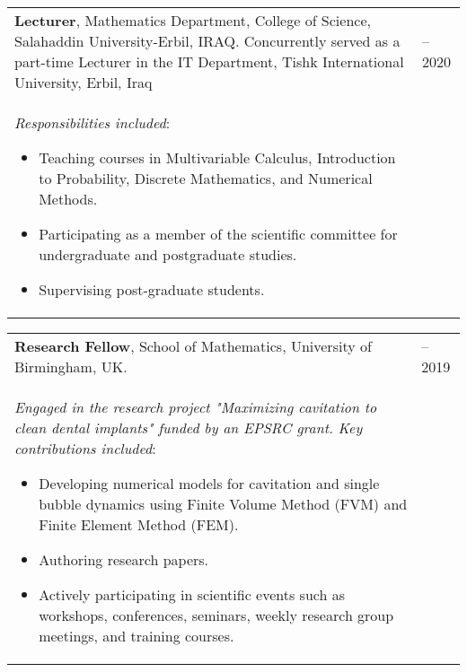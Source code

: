 \documentclass[line]{res}
\newenvironment{p1}
{\begin{adjustwidth}{-30pt}{0pt}
\vspace{8pt}}
{\end{adjustwidth}}
\begin{document}
\begin{resume}
\begin{p1}
\vspace{5pt}
\begin{tabular}{p{} >{\raggedleft\arraybackslash}p{}}
	\textbf{Lecturer}, Mathematics Department, College of Science, Salahaddin University-Erbil, IRAQ.  Concurrently served as a part-time Lecturer in the IT Department, Tishk International University, Erbil, Iraq& 2019--2020 \\
	\textit{Responsibilities included}:
	\begin{itemize}
		\item Teaching courses in Multivariable Calculus, Introduction to Probability, Discrete Mathematics, and Numerical Methods.
		\item Participating as a member of the scientific committee for undergraduate and postgraduate studies.
		\item Supervising post-graduate students.	
	\end{itemize}
\end{tabular}

\vspace{5pt}
\begin{tabular}{p{} >{\raggedleft\arraybackslash}p{}}
	\textbf{Research Fellow}, School of Mathematics, University of Birmingham, UK. & 2018--2019 \\
	\textit{Engaged in the research project "Maximizing cavitation to clean dental implants" funded by an EPSRC grant. Key contributions included}:
	\begin{itemize}
		\item Developing numerical models for cavitation and single bubble dynamics using Finite Volume Method (FVM) and Finite Element Method (FEM).
		\item Authoring research papers.
		\item Actively participating in scientific events such as workshops, conferences, seminars, weekly research group meetings, and training courses.
\end{itemize}
	\end{tabular}




\end{p1}
\end{resume}
\end{document}
